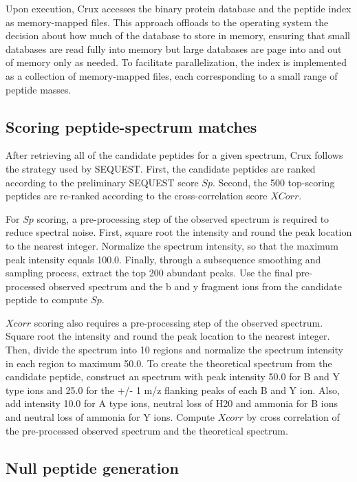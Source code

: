 \documentclass{bioinfo}
\begin{document}
Upon execution, Crux accesses the binary protein database and the
peptide index as memory-mapped files.  This approach offloads to the
operating system the decision about how much of the database to store
in memory, ensuring that small databases are read fully into memory
but large databases are page into and out of memory only as needed.
To facilitate parallelization, the index is implemented as a
collection of memory-mapped files, each corresponding to a small range
of peptide masses.

\subsection{Scoring peptide-spectrum matches}

After retrieving all of the candidate peptides for a given spectrum,
Crux follows the strategy used by SEQUEST.  First, the candidate
peptides are ranked according to the preliminary SEQUEST score $Sp$.
Second, the 500 top-scoring peptides are re-ranked according to the
cross-correlation score $XCorr$.

For $Sp$ scoring, a pre-processing step of the observed spectrum is 
required to reduce spectral noise. First, square root the intensity 
and round the peak location to the nearest integer. Normalize the
spectrum intensity, so that the maximum peak intensity equals 100.0. 
Finally, through a subsequence smoothing and sampling process, extract 
the top 200 abundant peaks. Use the final pre-processed observed spectrum 
and the b and y fragment ions from the candidate peptide to compute $Sp$.

$Xcorr$ scoring also requires a pre-processing step of the observed spectrum. 
Square root the intensity and round the peak location to the nearest integer. 
Then, divide the spectrum into 10 regions and normalize the spectrum 
intensity in each region to maximum 50.0. To create the theoretical spectrum 
from the candidate peptide, construct an spectrum with peak intensity 50.0 
for B and Y type ions and 25.0 for the +/- 1 m/z flanking  peaks of each B 
and Y ion. Also, add intensity 10.0 for A type ions, neutral loss of H20 and
ammonia for B ions and neutral loss of ammonia for Y ions. Compute $Xcorr$ by
cross correlation of the pre-processed observed spectrum and the theoretical
spectrum.

\subsection{Null peptide generation}
\end{document}
